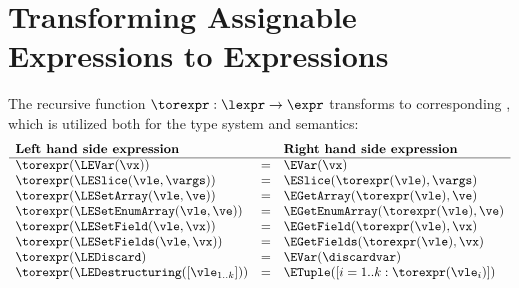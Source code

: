 \section{Transforming Assignable Expressions to Expressions\label{sec:LeftToRight}}
\hypertarget{relation-rexpr}{}
The recursive function $\torexpr : \lexpr \rightarrow \expr$ transforms
\assignableexpressions{} to corresponding \rhsexpressions{},
which is utilized both for the type system and semantics:
\[
\begin{array}{lcl}
  \textbf{Left hand side expression} & & \textbf{Right hand side expression}\\
  \hline
  \torexpr(\LEVar(\vx)) &=& \EVar(\vx)\\
  \torexpr(\LESlice(\vle, \vargs)) &=& \ESlice(\torexpr(\vle), \vargs)\\
  \torexpr(\LESetArray(\vle, \ve)) &=& \EGetArray(\torexpr(\vle), \ve)\\
  \torexpr(\LESetEnumArray(\vle, \ve)) &=& \EGetEnumArray(\torexpr(\vle), \ve)\\
  \torexpr(\LESetField(\vle, \vx)) &=& \EGetField(\torexpr(\vle), \vx)\\
  \torexpr(\LESetFields(\vle, \vx)) &=& \EGetFields(\torexpr(\vle), \vx)\\
  \torexpr(\LEDiscard) &=& \EVar(\discardvar)\\
  \torexpr(\LEDestructuring([\vle_{1..k}])) &=& \ETuple([i=1..k: \torexpr(\vle_i)])\\
\end{array}
\]

